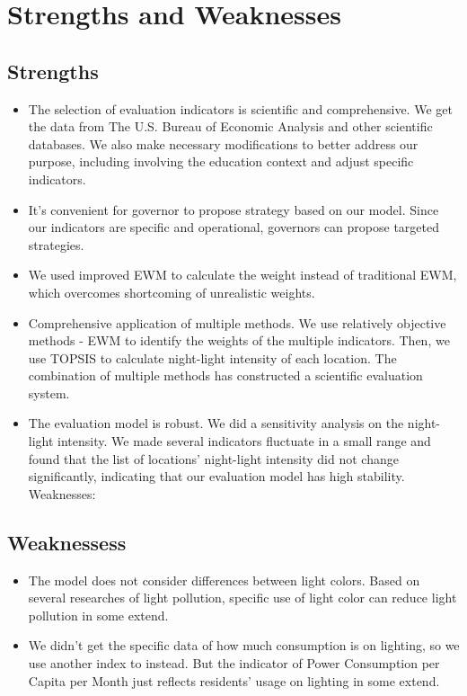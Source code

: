 \MinParskip{}

\section{Strengths and Weaknesses}
\subsection{Strengths}

\begin{itemize}
    \item The selection of evaluation indicators is scientific and comprehensive. We get the data from The U.S. Bureau of Economic Analysis and other scientific databases. We also make necessary modifications to better address our purpose, including involving the education context and adjust specific indicators.
    
    \item It's convenient for governor to propose strategy based on our model. Since our indicators are specific and operational, governors can propose targeted strategies. 
    
    \item We used improved EWM to calculate the weight instead of traditional EWM, which overcomes shortcoming of unrealistic weights.

    \item Comprehensive application of multiple methods. We use relatively objective methods - EWM to identify the weights of the multiple indicators. Then, we use TOPSIS to calculate night-light intensity of each location. The combination of multiple methods has constructed a scientific evaluation system.
    
    \item The evaluation model is robust. We did a sensitivity analysis on the night-light intensity. We made several indicators fluctuate in a small range and found that the list of locations' night-light intensity did not change significantly, indicating that our evaluation model has high stability.
    Weaknesses:
\end{itemize}


\subsection{Weaknessess}
\begin{itemize}
    \item The model does not consider differences between light colors. Based on several researches of light pollution, specific use of light color can reduce light pollution in some extend.
    
    \item We didn't get the specific data of how much consumption is on lighting, so we use another index to instead. But the indicator of Power Consumption per Capita per Month just reflects residents' usage on lighting in some extend.
\end{itemize}